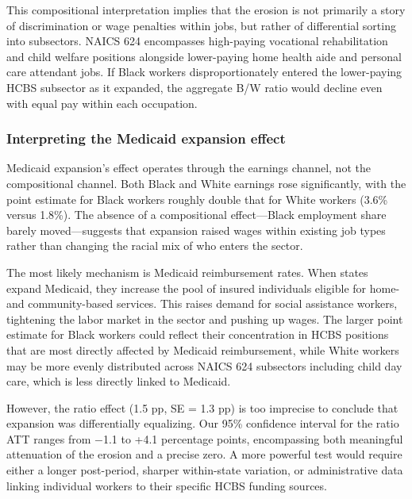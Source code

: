 \documentclass[12pt]{article}
\begin{document}
This compositional interpretation implies that the erosion is not primarily a story of discrimination or wage penalties within jobs, but rather of differential sorting into subsectors. NAICS 624 encompasses high-paying vocational rehabilitation and child welfare positions alongside lower-paying home health aide and personal care attendant jobs. If Black workers disproportionately entered the lower-paying HCBS subsector as it expanded, the aggregate B/W ratio would decline even with equal pay within each occupation.

\subsubsection*{Interpreting the Medicaid expansion effect} Medicaid expansion's effect operates through the earnings channel, not the compositional channel. Both Black and White earnings rose significantly, with the point estimate for Black workers roughly double that for White workers (3.6\% versus 1.8\%). The absence of a compositional effect---Black employment share barely moved---suggests that expansion raised wages within existing job types rather than changing the racial mix of who enters the sector.

The most likely mechanism is Medicaid reimbursement rates. When states expand Medicaid, they increase the pool of insured individuals eligible for home- and community-based services. This raises demand for social assistance workers, tightening the labor market in the sector and pushing up wages. The larger point estimate for Black workers could reflect their concentration in HCBS positions that are most directly affected by Medicaid reimbursement, while White workers may be more evenly distributed across NAICS 624 subsectors including child day care, which is less directly linked to Medicaid.

However, the ratio effect (1.5 pp, SE = 1.3 pp) is too imprecise to conclude that expansion was differentially equalizing. Our 95\% confidence interval for the ratio ATT ranges from $-$1.1 to +4.1 percentage points, encompassing both meaningful attenuation of the erosion and a precise zero. A more powerful test would require either a longer post-period, sharper within-state variation, or administrative data linking individual workers to their specific HCBS funding sources.
\end{document}
